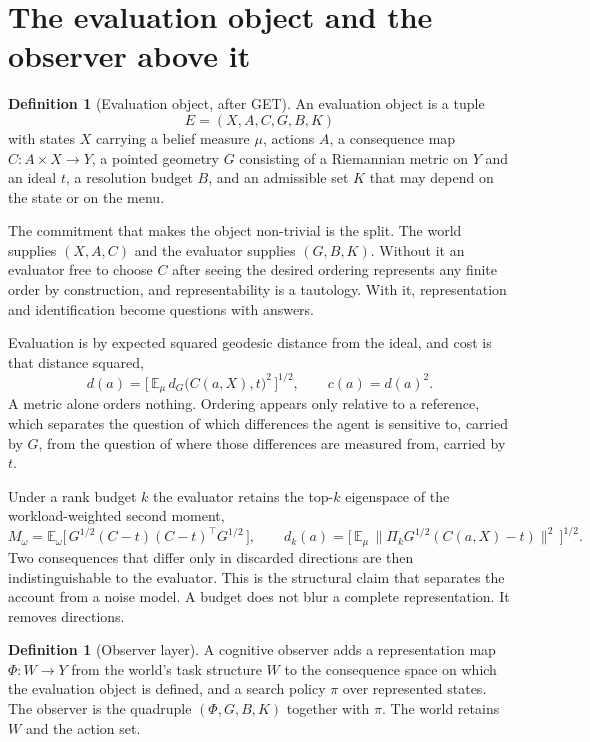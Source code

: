 \documentclass[11pt,letterpaper]{article}
\theoremstyle{plain}
\theoremstyle{definition}
\newtheorem{definition}[theorem]{Definition}
\newcommand{\Eb}{\mathbb{E}}
\begin{document}
\section{The evaluation object and the observer above it}

\begin{definition}[Evaluation object, after GET]
An evaluation object is a tuple
\[
E = (X, A, C, G, B, K)
\]
with states $X$ carrying a belief measure $\mu$, actions $A$, a consequence map
$C \colon A \times X \to Y$, a pointed geometry $G$ consisting of a Riemannian
metric on $Y$ and an ideal $t$, a resolution budget $B$, and an admissible set
$K$ that may depend on the state or on the menu.
\end{definition}

The commitment that makes the object non-trivial is the split. The world
supplies $(X, A, C)$ and the evaluator supplies $(G, B, K)$. Without it an
evaluator free to choose $C$ after seeing the desired ordering represents any
finite order by construction, and representability is a tautology. With it,
representation and identification become questions with answers.

Evaluation is by expected squared geodesic distance from the ideal, and cost is
that distance squared,
\[
d(a) = \bigl[\, \Eb_\mu\, d_G\bigl(C(a,X), t\bigr)^2 \,\bigr]^{1/2},
\qquad c(a) = d(a)^2 .
\]
A metric alone orders nothing. Ordering appears only relative to a reference,
which separates the question of which differences the agent is sensitive to,
carried by $G$, from the question of where those differences are measured from,
carried by $t$.

Under a rank budget $k$ the evaluator retains the top-$k$ eigenspace of the
workload-weighted second moment,
\[
M_\omega = \Eb_\omega\bigl[\, G^{1/2}(C-t)(C-t)^{\!\top} G^{1/2} \,\bigr],
\qquad
d_k(a) = \bigl[\, \Eb_\mu \,\|\Pi_k G^{1/2}(C(a,X)-t)\|^2 \,\bigr]^{1/2}.
\]
Two consequences that differ only in discarded directions are then
indistinguishable to the evaluator. This is the structural claim that separates
the account from a noise model. A budget does not blur a complete
representation. It removes directions.

\begin{definition}[Observer layer]
\label{def:observer}
A cognitive observer adds a representation map $\Phi \colon W \to Y$ from the
world's task structure $W$ to the consequence space on which the evaluation
object is defined, and a search policy $\pi$ over represented states. The
observer is the quadruple $(\Phi, G, B, K)$ together with $\pi$. The world
retains $W$ and the action set.
\end{definition}
\end{document}
